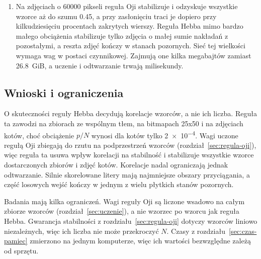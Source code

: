 \begin{enumerate}
    \item {}
    Na zdjęciach o \num{60000} pikseli reguła Oji stabilizuje i odzyskuje wszystkie wzorce aż do szumu \num{0.45}, a przy zasłonięciu traci je dopiero przy kilkudziesięciu procentach zakrytych wierszy. Reguła Hebba mimo bardzo małego obciążenia stabilizuje tylko zdjęcia o małej sumie nakładań z pozostałymi, a reszta zdjęć kończy w stanach pozornych. Sieć tej wielkości wymaga wag w postaci czynnikowej. Zajmują one kilka megabajtów zamiast \qty{26.8}{GiB}, a uczenie i odtwarzanie trwają milisekundy.
\end{enumerate}

\subsection{Wnioski i ograniczenia}
\label{sec:wnioski}

O skuteczności reguły Hebba decydują korelacje wzorców, a nie ich liczba. Reguła ta zawodzi na zbiorach ze wspólnym tłem, na bitmapach \mbox{25x50} i na zdjęciach kotów, choć obciążenie $p/N$ wynosi dla kotów tylko \num{2e-4}. Wagi uczone regułą Oji zbiegają do rzutu na podprzestrzeń wzorców (rozdział~\ref{sec:regula-oji}), więc reguła ta usuwa wpływ korelacji na stabilność i stabilizuje wszystkie wzorce dostarczonych zbiorów i zdjęć kotów. Korelacje nadal ograniczają jednak odtwarzanie. Silnie skorelowane litery mają najmniejsze obszary przyciągania, a część losowych wejść kończy w jednym z wielu płytkich stanów pozornych.

Badania mają kilka ograniczeń. Wagi reguły Oji są liczone wsadowo na całym zbiorze wzorców (rozdział~\ref{sec:uczenie}), a nie wzorzec po wzorcu jak reguła Hebba. Gwarancja stabilności z rozdziału~\ref{sec:regula-oji} dotyczy wzorców liniowo niezależnych, więc ich liczba nie może przekroczyć $N$. Czasy z rozdziału~\ref{sec:czas-pamiec} zmierzono na jednym komputerze, więc ich wartości bezwzględne zależą od sprzętu.
